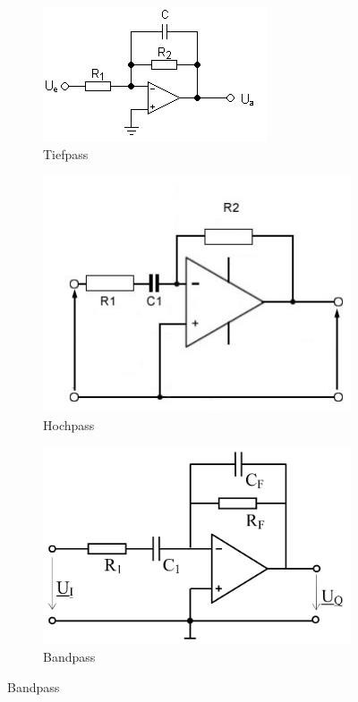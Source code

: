 	\begin{figure}[h]
		\begin{subfigure}{0.25\textwidth}
		\includegraphics[width=\textwidth]{images/Aktiver_Tiefpass}
		\caption{Tiefpass}
		\end{subfigure}
		\begin{subfigure}{0.25\textwidth}
		\includegraphics[width=\textwidth]{images/aktiver_hochpass}
		\caption{Hochpass}
		\end{subfigure}
		\begin{subfigure}{0.25\textwidth}
		\includegraphics[width=\textwidth]{images/Bandpass}
		\caption{Bandpass}
		\end{subfigure}
	\end{figure}
